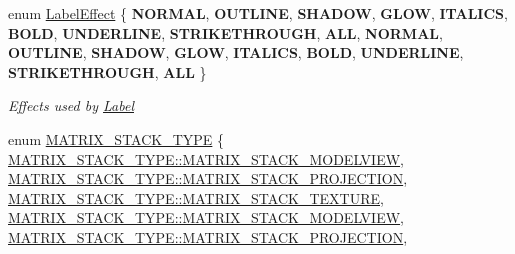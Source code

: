 \begin{DoxyCompactItemize}
\item 
\mbox{\label{group__base_ga26fd049ca5303e0cf4435208058f32e4}} 
enum \hyperlink{group__base_ga26fd049ca5303e0cf4435208058f32e4}{Label\+Effect} \{ \newline
{\bfseries N\+O\+R\+M\+AL}, 
{\bfseries O\+U\+T\+L\+I\+NE}, 
{\bfseries S\+H\+A\+D\+OW}, 
{\bfseries G\+L\+OW}, 
\newline
{\bfseries I\+T\+A\+L\+I\+CS}, 
{\bfseries B\+O\+LD}, 
{\bfseries U\+N\+D\+E\+R\+L\+I\+NE}, 
{\bfseries S\+T\+R\+I\+K\+E\+T\+H\+R\+O\+U\+GH}, 
\newline
{\bfseries A\+LL}, 
{\bfseries N\+O\+R\+M\+AL}, 
{\bfseries O\+U\+T\+L\+I\+NE}, 
{\bfseries S\+H\+A\+D\+OW}, 
\newline
{\bfseries G\+L\+OW}, 
{\bfseries I\+T\+A\+L\+I\+CS}, 
{\bfseries B\+O\+LD}, 
{\bfseries U\+N\+D\+E\+R\+L\+I\+NE}, 
\newline
{\bfseries S\+T\+R\+I\+K\+E\+T\+H\+R\+O\+U\+GH}, 
{\bfseries A\+LL}
 \}\begin{DoxyCompactList}\small\item\em Effects used by {\ttfamily \hyperlink{classLabel}{Label}} \end{DoxyCompactList}
\item 
enum \hyperlink{group__base_ga4d146cef7130a8f3a953d46964ea3905}{M\+A\+T\+R\+I\+X\+\_\+\+S\+T\+A\+C\+K\+\_\+\+T\+Y\+PE} \{ \newline
\hyperlink{group__base_gga4d146cef7130a8f3a953d46964ea3905a2c38cdb8eb5928738bbcda4e5f085920}{M\+A\+T\+R\+I\+X\+\_\+\+S\+T\+A\+C\+K\+\_\+\+T\+Y\+P\+E\+::\+M\+A\+T\+R\+I\+X\+\_\+\+S\+T\+A\+C\+K\+\_\+\+M\+O\+D\+E\+L\+V\+I\+EW}, 
\hyperlink{group__base_gga4d146cef7130a8f3a953d46964ea3905aad1cc2649728ae11b69b747a58845764}{M\+A\+T\+R\+I\+X\+\_\+\+S\+T\+A\+C\+K\+\_\+\+T\+Y\+P\+E\+::\+M\+A\+T\+R\+I\+X\+\_\+\+S\+T\+A\+C\+K\+\_\+\+P\+R\+O\+J\+E\+C\+T\+I\+ON}, 
\hyperlink{group__base_gga4d146cef7130a8f3a953d46964ea3905a34b60a12b3b0826d198a5f18ef4f48c8}{M\+A\+T\+R\+I\+X\+\_\+\+S\+T\+A\+C\+K\+\_\+\+T\+Y\+P\+E\+::\+M\+A\+T\+R\+I\+X\+\_\+\+S\+T\+A\+C\+K\+\_\+\+T\+E\+X\+T\+U\+RE}, 
\hyperlink{group__base_gga4d146cef7130a8f3a953d46964ea3905a2c38cdb8eb5928738bbcda4e5f085920}{M\+A\+T\+R\+I\+X\+\_\+\+S\+T\+A\+C\+K\+\_\+\+T\+Y\+P\+E\+::\+M\+A\+T\+R\+I\+X\+\_\+\+S\+T\+A\+C\+K\+\_\+\+M\+O\+D\+E\+L\+V\+I\+EW}, 
\newline
\hyperlink{group__base_gga4d146cef7130a8f3a953d46964ea3905aad1cc2649728ae11b69b747a58845764}{M\+A\+T\+R\+I\+X\+\_\+\+S\+T\+A\+C\+K\+\_\+\+T\+Y\+P\+E\+::\+M\+A\+T\+R\+I\+X\+\_\+\+S\+T\+A\+C\+K\+\_\+\+P\+R\+O\+J\+E\+C\+T\+I\+ON}, 

\end{DoxyCompactItemize}
